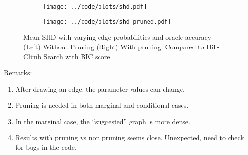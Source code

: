 \documentclass[letterpaper]{article}
\begin{document}
\begin{figure}[H]
	\begin{subfigure}{0.5 \textwidth}
		\centering
		\texttt{[image: ../code/plots/shd.pdf]}
	\end{subfigure}%
	\begin{subfigure}{0.5 \textwidth}
		\centering
		\texttt{[image: ../code/plots/shd\_pruned.pdf]}
	\end{subfigure}
		\caption{Mean SHD with varying edge probabilities and oracle accuracy (Left) Without Pruning (Right) With pruning. Compared to Hill-Climb Search with BIC score}
\end{figure}

Remarks:
\begin{enumerate}
	\item After drawing an edge, the parameter values can change.
	\item Pruning is needed in both marginal and conditional cases.
	\item In the marginal case, the ``suggested'' graph is more dense.
	\item Results with pruning vs non pruning seems close. Unexpected, need to check for bugs in the code.
\end{enumerate}
\end{document}
